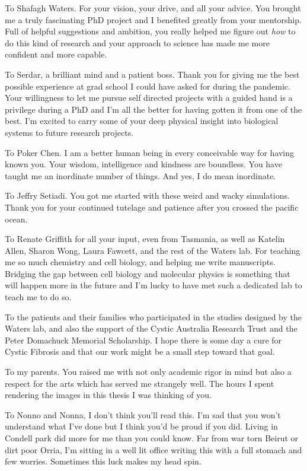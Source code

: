 To Shafagh Waters. For your vision, your drive, and all your advice. You brought me a truly fascinating PhD project and I benefited greatly from your mentorship. Full of helpful suggestions and ambition, you really helped me figure out \textit{how} to do this kind of research and your approach to science has made me more confident and more capable.

To Serdar, a brilliant mind and a patient boss. Thank you for giving me the best possible experience at grad school I could have asked for during the pandemic. Your willingness to let me pursue self directed projects with a guided hand is a privilege during a PhD and I'm all the better for having gotten it from one of the best. I'm excited to carry some of your deep physical insight into biological systems to future research projects. 

To Poker Chen. I am a better human being in every conceivable way for having known you. Your wisdom, intelligence and kindness are boundless. You have taught me an inordinate number of things. And yes, I do mean inordinate.

To Jeffry Setiadi. You got me started with these weird and wacky simulations. Thank you for your continued tutelage and patience after you crossed the pacific ocean.

To Renate Griffith for all your input, even from Tasmania, as well as Katelin Allen, Sharon Wong, Laura Fawcett, and the rest of the Waters lab. For teaching me so much chemistry and cell biology, and helping me write manuscripts. Bridging the gap between cell biology and molecular physics is something that will happen more in the future and I'm lucky to have met such a dedicated lab to teach me to do so.

To the patients and their families who participated in the studies designed by the Waters lab, and also the support of the Cystic Australia Research Trust and the Peter Domachuck Memorial Scholarship. I hope there is some day a cure for Cystic Fibrosis and that our work might be a small step toward that goal.

To my parents. You raised me with not only academic rigor in mind but also a respect for the arts which has served me strangely well. The hours I spent rendering the images in this thesis I was thinking of you.

To Nonno and Nonna, I don't think you'll read this. I'm sad that you won't understand what I've done but I think you'd be proud if you did. Living in Condell park did more for me than you could know. Far from war torn Beirut or dirt poor Orria, I'm sitting in a well lit office writing this with a full stomach and few worries. Sometimes this luck makes my head spin. 

